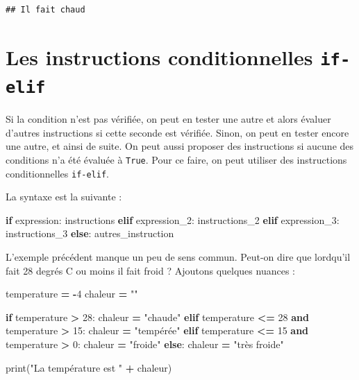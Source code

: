 \documentclass[12pt,]{book}
\newenvironment{Shaded}{\begin{snugshade}}{\end{snugshade}}
\newcommand{\KeywordTok}[1]{\textcolor[rgb]{0.13,0.29,0.53}{\textbf{#1}}}
\newcommand{\DecValTok}[1]{\textcolor[rgb]{0.00,0.00,0.81}{#1}}
\newcommand{\StringTok}[1]{\textcolor[rgb]{0.31,0.60,0.02}{#1}}
\newcommand{\ControlFlowTok}[1]{\textcolor[rgb]{0.13,0.29,0.53}{\textbf{#1}}}
\newcommand{\OperatorTok}[1]{\textcolor[rgb]{0.81,0.36,0.00}{\textbf{#1}}}
\newcommand{\BuiltInTok}[1]{#1}
\newcommand{\NormalTok}[1]{#1}
\numberwithin{equation}{section}
\numberwithin{countremarque}{section}
\begin{document}
\begin{lstlisting}
## Il fait chaud
\end{lstlisting}

\section{\texorpdfstring{Les instructions conditionnelles
\texttt{if-elif}}{Les instructions conditionnelles if-elif}}\label{les-instructions-conditionnelles-if-elif}

Si la condition n'est pas vérifiée, on peut en tester une autre et alors
évaluer d'autres instructions si cette seconde est vérifiée. Sinon, on
peut en tester encore une autre, et ainsi de suite. On peut aussi
proposer des instructions si aucune des conditions n'a été évaluée à
\texttt{True}. Pour ce faire, on peut utiliser des instructions
conditionnelles \texttt{if-elif}.

La syntaxe est la suivante :

\begin{Shaded}
\begin{Highlighting}[]
\ControlFlowTok{if}\NormalTok{ expression:}
\NormalTok{  instructions}
\ControlFlowTok{elif}\NormalTok{ expression_2:}
\NormalTok{  instructions_2}
\ControlFlowTok{elif}\NormalTok{ expression_3:}
\NormalTok{  instructions_3}
\ControlFlowTok{else}\NormalTok{:}
\NormalTok{  autres_instruction}
\end{Highlighting}
\end{Shaded}

L'exemple précédent manque un peu de sens commun. Peut-on dire que
lordqu'il fait 28 degrés C ou moins il fait froid ? Ajoutons quelques
nuances :

\begin{Shaded}
\begin{Highlighting}[]
\NormalTok{temperature }\OperatorTok{=} \OperatorTok{-}\DecValTok{4}
\NormalTok{chaleur }\OperatorTok{=} \StringTok{""}

\ControlFlowTok{if}\NormalTok{ temperature }\OperatorTok{>} \DecValTok{28}\NormalTok{:}
\NormalTok{  chaleur }\OperatorTok{=} \StringTok{"chaude"}
\ControlFlowTok{elif}\NormalTok{ temperature }\OperatorTok{<=} \DecValTok{28} \KeywordTok{and}\NormalTok{ temperature }\OperatorTok{>} \DecValTok{15}\NormalTok{:}
\NormalTok{  chaleur }\OperatorTok{=} \StringTok{"tempérée"}
\ControlFlowTok{elif}\NormalTok{ temperature }\OperatorTok{<=} \DecValTok{15} \KeywordTok{and}\NormalTok{ temperature }\OperatorTok{>} \DecValTok{0}\NormalTok{:}
\NormalTok{  chaleur }\OperatorTok{=} \StringTok{"froide"}
\ControlFlowTok{else}\NormalTok{:}
\NormalTok{  chaleur }\OperatorTok{=} \StringTok{"très froide"}

\BuiltInTok{print}\NormalTok{(}\StringTok{"La température est "} \OperatorTok{+}\NormalTok{ chaleur)}
\end{Highlighting}
\end{Shaded}
\end{document}
